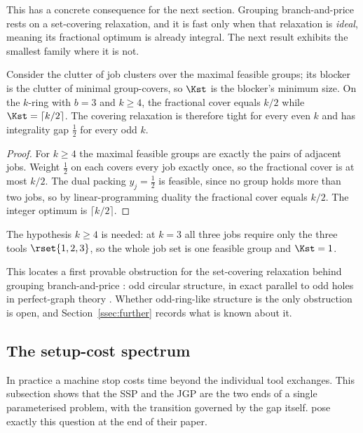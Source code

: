 This has a concrete consequence for the next section. Grouping branch-and-price rests
on a set-covering relaxation, and it is fast only when that relaxation is
\emph{ideal}, meaning its fractional optimum is already integral. The next result
exhibits the smallest family where it is not.

\begin{proposition}\label{prop:oddring}
Consider the clutter of job clusters over the maximal feasible groups; its blocker is
the clutter of minimal group-covers, so $\Kst$ is the blocker's minimum size. On the
$k$-ring with $b=3$ and $k\ge4$, the fractional cover equals $k/2$ while
$\Kst=\lceil k/2\rceil$. The covering relaxation is therefore tight for every even
$k$ and has integrality gap $\tfrac12$ for every odd $k$.
\end{proposition}

\begin{proof}
For $k\ge4$ the maximal feasible groups are exactly the pairs of adjacent jobs.
Weight $\tfrac12$ on each covers every job exactly once, so the fractional cover is at
most $k/2$. The dual packing $y_j=\tfrac12$ is feasible, since no group holds more than
two jobs, so by linear-programming duality the fractional cover equals $k/2$. The
integer optimum is $\lceil k/2\rceil$.
\end{proof}

The hypothesis $k\ge4$ is needed: at $k=3$ all three jobs require only the three tools
$\rset{1,2,3}$, so the whole job set is one feasible group and $\Kst=1$.

This locates a first provable obstruction for the set-covering relaxation behind
grouping branch-and-price \citep{Crama1994Column,Otiai2024}: odd circular structure,
in exact parallel to odd holes in perfect-graph theory \citep{Chudnovsky2006}. Whether
odd-ring-like structure is the only obstruction is open, and
Section~\ref{ssec:further} records what is known about it.

\subsection{The setup-cost spectrum}\label{ssec:collapse}

In practice a machine stop costs time beyond the individual tool exchanges. This
subsection shows that the SSP and the JGP are the two ends of a single parameterised
problem, with the transition governed by the gap itself. \citet{Burger2015} pose
exactly this question at the end of their paper.

